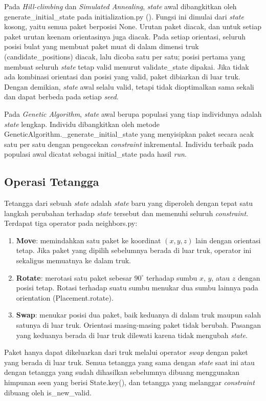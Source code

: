 Pada \textit{Hill-climbing} dan \textit{Simulated Annealing}, \textit{state} awal dibangkitkan oleh generate\_initial\_state pada initialization.py (). Fungsi ini dimulai dari \textit{state} kosong, yaitu semua paket berposisi None. Urutan paket diacak, dan untuk setiap paket urutan keenam orientasinya juga diacak. Pada setiap orientasi, seluruh posisi bulat yang membuat paket muat di dalam dimensi truk (candidate\_positions) diacak, lalu dicoba satu per satu; posisi pertama yang membuat seluruh \textit{state} tetap valid menurut validate\_state dipakai. Jika tidak ada kombinasi orientasi dan posisi yang valid, paket dibiarkan di luar truk. Dengan demikian, \textit{state} awal selalu valid, tetapi tidak dioptimalkan sama sekali dan dapat berbeda pada setiap \textit{seed}.


Pada \textit{Genetic Algorithm}, \textit{state} awal berupa populasi yang tiap individunya adalah \textit{state} lengkap. Individu dibangkitkan oleh metode GeneticAlgorithm.\_generate\_initial\_state yang menyisipkan paket secara acak satu per satu dengan pengecekan \textit{constraint} inkremental. Individu terbaik pada populasi awal dicatat sebagai initial\_state pada hasil \textit{run}.

\subsection{Operasi Tetangga}

Tetangga dari sebuah \textit{state} adalah \textit{state} baru yang diperoleh dengan tepat satu langkah perubahan terhadap \textit{state} tersebut dan memenuhi seluruh \textit{constraint}. Terdapat tiga operator pada neighbors.py:
\begin{enumerate}
    \item \textbf{Move}: memindahkan satu paket ke koordinat $(x, y, z)$ lain dengan orientasi tetap. Jika paket yang dipilih sebelumnya berada di luar truk, operator ini sekaligus memuatnya ke dalam truk.
    \item \textbf{Rotate}: merotasi satu paket sebesar $90^\circ$ terhadap sumbu $x$, $y$, atau $z$ dengan posisi tetap. Rotasi terhadap suatu sumbu menukar dua sumbu lainnya pada orientation (Placement.rotate).
    \item \textbf{Swap}: menukar posisi dua paket, baik keduanya di dalam truk maupun salah satunya di luar truk. Orientasi masing-masing paket tidak berubah. Pasangan yang keduanya berada di luar truk dilewati karena tidak mengubah \textit{state}.
\end{enumerate}
Paket hanya dapat dikeluarkan dari truk melalui operator \textit{swap} dengan paket yang berada di luar truk. Semua tetangga yang sama dengan \textit{state} saat ini atau dengan tetangga yang sudah dihasilkan sebelumnya dibuang menggunakan himpunan seen yang berisi State.key(), dan tetangga yang melanggar \textit{constraint} dibuang oleh is\_new\_valid.


